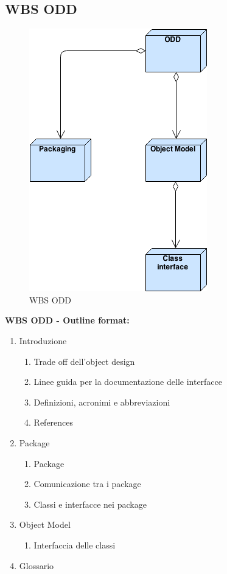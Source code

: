 \subsection{WBS ODD}
\begin{figure}[ht]
\centering
\includegraphics[width=.5\textwidth]{img/ODD.png}
\caption{WBS ODD} 
\end{figure}
\textbf{WBS ODD - Outline format:}
\begin{enumerate}
\item Introduzione
\begin{enumerate}[label*=\arabic*.]
\item Trade off dell'object design
\item Linee guida per la documentazione delle interfacce
\item Definizioni, acronimi e abbreviazioni
\item References
\end{enumerate}
\item Package
\begin{enumerate}[label*=\arabic*.]
\item Package
\item Comunicazione tra i package
\item Classi e interfacce nei package
\end{enumerate}
\item Object Model
\begin{enumerate}[label*=\arabic*.]
\item Interfaccia delle classi
\end{enumerate}
\item Glossario
\end{enumerate}
\clearpage

